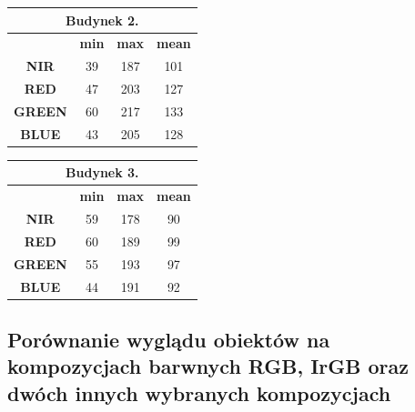 \documentclass[a4paper,12pt]{article}  %
\begin{document}
\begin{table}[h!]
\centering
\begin{tabular}{|c|c|c|c|}
\hline
\multicolumn{4}{|c|}{\textbf{Budynek 2.}} \\ \hline
\textbf{} & \textbf{min} & \textbf{max} & \textbf{mean} \\ \hline
\textbf{NIR} & 39 & 187 & 101\\ \hline
\textbf{RED} & 47 & 203 & 127\\ \hline
\textbf{GREEN} & 60 & 217 & 133\\ \hline
\textbf{BLUE} & 43 & 205 & 128\\ \hline
\end{tabular}
\end{table}

\begin{table}[h!]
\centering
\begin{tabular}{|c|c|c|c|}
\hline
\multicolumn{4}{|c|}{\textbf{Budynek 3.}} \\ \hline
\textbf{} & \textbf{min} & \textbf{max} & \textbf{mean} \\ \hline
\textbf{NIR} & 59 & 178 & 90\\ \hline
\textbf{RED} & 60 & 189 & 99\\ \hline
\textbf{GREEN} & 55 & 193 & 97\\ \hline
\textbf{BLUE} & 44 & 191 & 92\\ \hline
\end{tabular}
\end{table}

\newpage
\subsection{Porównanie wyglądu obiektów na kompozycjach barwnych RGB, IrGB oraz dwóch innych wybranych kompozycjach}
\end{document}
